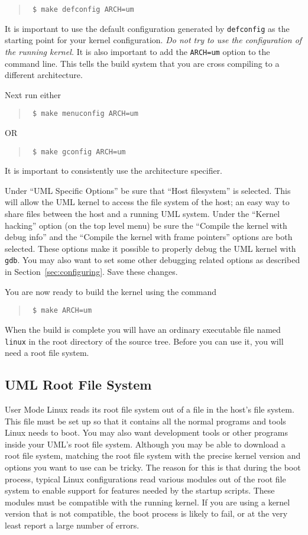 \documentclass{article}
\newcommand{\command}[1]{\texttt{#1}}    %
\newenvironment{commands}
  {\begin{quote} \tt}
  {\end{quote}}
\begin{document}
\begin{commands}
\$ make defconfig ARCH=um
\end{commands}

It is important to use the default configuration generated by \command{defconfig} as the
starting point for your kernel configuration. \emph{Do not try to use the configuration of the
  running kernel.} It is also important to add the \command{ARCH=um} option to the command line.
This tells the build system that you are cross compiling to a different architecture.

Next run either
\begin{commands}
\$ make menuconfig ARCH=um
\end{commands}
OR
\begin{commands}
\$ make gconfig ARCH=um
\end{commands}

It is important to consistently use the architecture specifier.

Under ``UML Specific Options'' be sure that ``Host filesystem'' is selected. This will allow the
UML kernel to access the file system of the host; an easy way to share files between the host
and a running UML system. Under the ``Kernel hacking'' option (on the top level menu) be sure
the ``Compile the kernel with debug info'' and the ``Compile the kernel with frame pointers''
options are both selected. These options make it possible to properly debug the UML kernel with
\command{gdb}. You may also want to set some other debugging related options as described in
Section~\ref{sec:configuring}. Save these changes.

You are now ready to build the kernel using the command
\begin{commands}
\$ make ARCH=um
\end{commands}

When the build is complete you will have an ordinary executable file named \command{linux} in
the root directory of the source tree. Before you can use it, you will need a root file system.

\subsection{UML Root File System}

User Mode Linux reads its root file system out of a file in the host's file system. This file
must be set up so that it contains all the normal programs and tools Linux needs to boot. You
may also want development tools or other programs inside your UML's root file system. Although
you may be able to download a root file system, matching the root file system with the precise
kernel version and options you want to use can be tricky. The reason for this is that during the
boot process, typical Linux configurations read various modules out of the root file system to
enable support for features needed by the startup scripts. These modules must be compatible with
the running kernel. If you are using a kernel version that is not compatible, the boot process
is likely to fail, or at the very least report a large number of errors.
\end{document}
